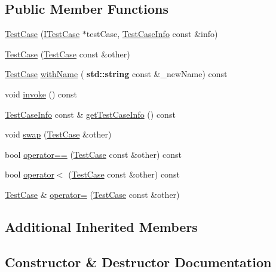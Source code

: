 \subsection*{Public Member Functions}
\begin{DoxyCompactItemize}
\item 
\hyperlink{class_catch_1_1_test_case_a03a5b913484681bd6d398dc5e9c2a907}{Test\+Case} (\hyperlink{struct_catch_1_1_i_test_case}{I\+Test\+Case} $\ast$test\+Case, \hyperlink{struct_catch_1_1_test_case_info}{Test\+Case\+Info} const \&info)
\item 
\hyperlink{class_catch_1_1_test_case_ac0011d3789edc3e44edb41f13c4775a0}{Test\+Case} (\hyperlink{class_catch_1_1_test_case}{Test\+Case} const \&other)
\item 
\hyperlink{class_catch_1_1_test_case}{Test\+Case} \hyperlink{class_catch_1_1_test_case_a0812e8a216d09b087d5874687009f0d6}{with\+Name} (\textbf{ std\+::string} const \&\+\_\+new\+Name) const
\item 
void \hyperlink{class_catch_1_1_test_case_a26f346c8446dded0562fe3818ae71651}{invoke} () const
\item 
\hyperlink{struct_catch_1_1_test_case_info}{Test\+Case\+Info} const  \& \hyperlink{class_catch_1_1_test_case_a1ea0d79f49156cebea076fe1ba50d2b6}{get\+Test\+Case\+Info} () const
\item 
void \hyperlink{class_catch_1_1_test_case_aee38f908faf10b905b209ca388275413}{swap} (\hyperlink{class_catch_1_1_test_case}{Test\+Case} \&other)
\item 
bool \hyperlink{class_catch_1_1_test_case_a5456d03a90f75292835c158f3a3374a1}{operator==} (\hyperlink{class_catch_1_1_test_case}{Test\+Case} const \&other) const
\item 
bool \hyperlink{class_catch_1_1_test_case_a030e4b9282e9b32e08c8bd5e5cd6fa98}{operator$<$} (\hyperlink{class_catch_1_1_test_case}{Test\+Case} const \&other) const
\item 
\hyperlink{class_catch_1_1_test_case}{Test\+Case} \& \hyperlink{class_catch_1_1_test_case_a8022e3f74232f7887d2d2cbbc8876502}{operator=} (\hyperlink{class_catch_1_1_test_case}{Test\+Case} const \&other)
\end{DoxyCompactItemize}
\subsection*{Additional Inherited Members}


\subsection{Constructor \& Destructor Documentation}
\mbox{\label{class_catch_1_1_test_case_a03a5b913484681bd6d398dc5e9c2a907}} 
